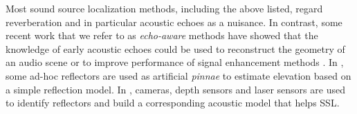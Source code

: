 






Most sound source localization methods, including the above listed,
regard reverberation and in particular acoustic echoes as a nuisance.
In contrast, some recent work that we refer to as \textit{echo-aware}
methods have showed that the knowledge of early acoustic echoes could
be used to reconstruct the geometry of an audio scene \cite{Nakashima2010,dokmanic2013acoustic,An2018}
or to improve performance of signal enhancement methods \cite{flanagan1993spatially, dokmanic2015raking,Scheibler2017}.
In \cite{Nakashima2010}, some ad-hoc reflectors are used as artificial \textit{pinnae}
to estimate elevation based on a simple reflection model.
In \cite{An2018}, cameras, depth sensors and laser sensors are used to
identify reflectors and build a corresponding acoustic model that helps SSL.

